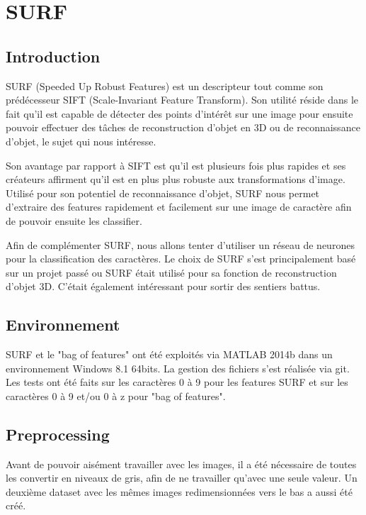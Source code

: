 \chapter{SURF}

\section{Introduction}

SURF (Speeded Up Robust Features) est un descripteur tout comme son prédécesseur SIFT (Scale-Invariant Feature Transform). Son utilité réside dans le fait qu'il est capable de détecter des points d'intérêt sur une image pour ensuite pouvoir effectuer des tâches de reconstruction d'objet en 3D ou de reconnaissance d'objet, le sujet qui nous intéresse.

Son avantage par rapport à SIFT est qu'il est plusieurs fois plus rapides et ses créateurs affirment qu'il est en plus plus robuste aux transformations d'image. Utilisé pour son potentiel de reconnaissance d'objet, SURF nous permet d'extraire des features rapidement et facilement sur une image de caractère afin de pouvoir ensuite les classifier.

Afin de complémenter SURF, nous allons tenter d'utiliser un réseau de neurones pour la classification des caractères. Le choix de SURF s'est principalement basé sur un projet passé ou SURF était utilisé pour sa fonction de reconstruction d'objet 3D. C'était également intéressant pour sortir des sentiers battus.

\section{Environnement}

SURF et le "bag of features" ont été exploités via MATLAB 2014b dans un environnement Windows 8.1 64bits. La gestion des fichiers s'est réalisée via git. Les tests ont été faits sur les caractères 0 à 9 pour les features SURF et sur les caractères 0 à 9 et/ou 0 à z pour "bag of features".

\section{Preprocessing}

Avant de pouvoir aisément travailler avec les images, il a été nécessaire de toutes les convertir en niveaux de gris, afin de ne travailler qu'avec une seule valeur. Un deuxième dataset avec les mêmes images redimensionnées vers le bas a aussi été créé.

